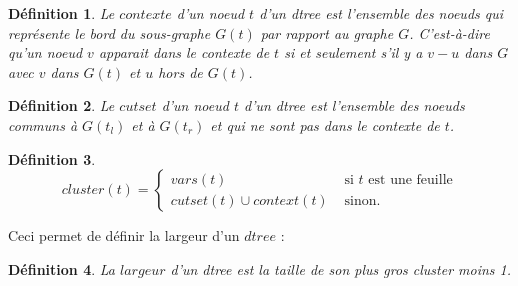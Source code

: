\documentclass[handout]{beamer}
\newtheorem*{mdef}{Définition}
\begin{document}
\begin{frame}

\begin{mdef}
Le $contexte$ d'un noeud $t$ d'un dtree est l'ensemble des noeuds
qui représente le bord du sous-graphe $G(t)$ par rapport au graphe
$G$. C'est-à-dire qu'un noeud $v$ apparait dans le contexte de $t$ si
et seulement s'il y a $v-u$ dans $G$ avec $v$ dans $G(t)$ et $u$ hors
de $G(t)$.
\end{mdef}

\begin{mdef}
Le $cutset$ d'un noeud $t$ d'un dtree est l'ensemble des noeuds
communs à $G(t_l)$ et à $G(t_r)$ et qui ne sont pas dans le contexte
de $t$.
\end{mdef}

\begin{mdef}
$$
cluster(t) = \left\{
    \begin{array}{ll}
        vars(t) & \mbox{ si $t$ est une feuille} \\
        cutset(t) \cup context(t) & \mbox{ sinon.}
    \end{array}
\right.
$$
\end{mdef}

Ceci permet de définir la largeur d'un $dtree$ : 
\begin{mdef}
La $largeur$ d'un dtree est la taille de son plus gros cluster
moins 1.
\end{mdef}

\end{frame}
\end{document}

